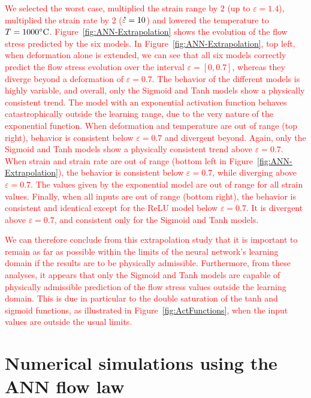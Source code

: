 \documentclass[algorithms,article,submit,pdftex,oneauthors]{Definitions/mdpi}
\DeclareRobustCommand{\mdot}[1]{\accentset{\mbox{\bfseries .}}{#1}}
\begin{document}
\textcolor{red}{We selected the worst case, multiplied the strain range by $2$ (up to $\varepsilon=1.4$), multiplied the strain rate by 2 ($\mdot{\varepsilon}=10$) and lowered the temperature to $T=1000\celsius$.
Figure~\ref{fig:ANN-Extrapolation} shows the evolution of the flow stress predicted by the six models.
In Figure~\ref{fig:ANN-Extrapolation}, top left, when deformation alone is extended, we can see that all six models correctly predict the flow stress evolution over the interval $\varepsilon=[0,0.7]$, whereas they diverge beyond a deformation of $\varepsilon=0.7$.
The behavior of the different models is highly variable, and overall, only the Sigmoid and Tanh models show a physically consistent trend.
The model with an exponential activation function behaves catastrophically outside the learning range, due to the very nature of the exponential function.
When deformation and temperature are out of range (top right), behavior is consistent below $\varepsilon=0.7$ and divergent beyond.
Again, only the Sigmoid and Tanh models show a physically consistent trend above $\varepsilon=0.7$.
When strain and strain rate are out of range (bottom left in Figure~\ref{fig:ANN-Extrapolation}), the behavior is consistent below $\varepsilon=0.7$, while diverging above $\varepsilon=0.7$.
The values given by the exponential model are out of range for all strain values.
Finally, when all inputs are out of range (bottom right), the behavior is consistent and identical except for the ReLU model below $\varepsilon=0.7$.
It is divergent above $\varepsilon=0.7$, and consistent only for the Sigmoid and Tanh models.}

\textcolor{red}{We can therefore conclude from this extrapolation study that it is important to remain as far as possible within the limits of the neural network's learning domain if the results are to be physically admissible.
Furthermore, from these analyses, it appears that only the Sigmoid and Tanh models are capable of physically admissible prediction of the flow stress values outside the learning domain.
This is due in particular to the double saturation of the tanh and sigmoid functions, as illustrated in Figure~\ref{fig:ActFunctions}, when the input values are outside the usual limits.}

\section{Numerical simulations using the ANN flow law}\label{sec:Numerical}
\end{document}
